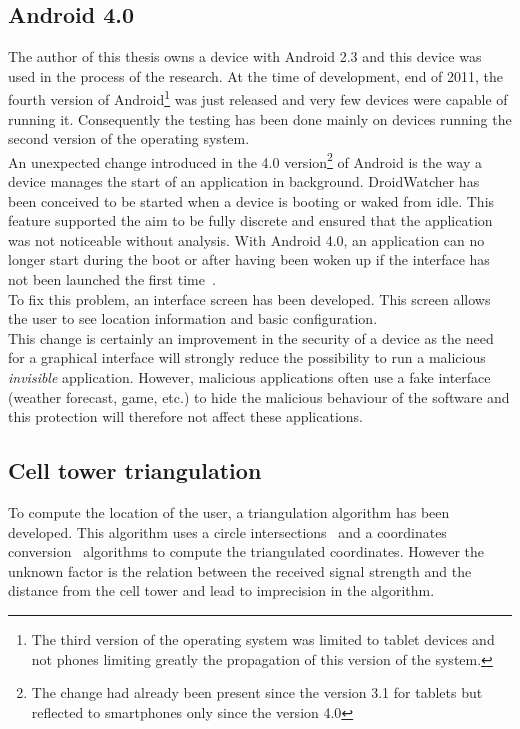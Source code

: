 \subsection{Android 4.0}
\label{sec:dw-ics}

The author of this thesis owns a device with Android 2.3 and this device was used in the process of the research. 
At the time of development, end of 2011, the fourth version of Android\footnote{The third version of the operating system was limited to tablet devices and not phones limiting greatly the propagation of this version of the system.} was just released and very few devices were capable of running it.
Consequently the testing has been done mainly on devices running the second version of the operating system.\\

An unexpected change introduced in the 4.0 version\footnote{The change had already been present since the version 3.1 for tablets but reflected to smartphones only since the version 4.0} of Android is the way a device manages the start of an application in background.
DroidWatcher has been conceived to be started when a device is booting or waked from idle.
This feature supported the aim to be fully discrete and ensured that the application was not noticeable without analysis.
With Android 4.0, an application can no longer start during the boot or after having been woken up if the interface has not been launched the first time~\cite{boot-restrictions}.\\

To fix this problem, an interface screen has been developed.
This screen allows the user to see location information and basic configuration.\\

This change is certainly an improvement in the security of a device as the need for a graphical interface will strongly reduce the possibility to run a malicious \emph{invisible} application.
However, malicious applications often use a fake interface (weather forecast, game, etc.) to hide the malicious behaviour of the software and this protection will therefore not affect these applications.

\subsection{Cell tower triangulation}
\label{sec:dw-difficult-cell}

To compute the location of the user, a triangulation algorithm has been developed.
This algorithm uses a circle intersections~\cite{circle-inter} and a coordinates conversion~\cite{ibm-coordinates} algorithms to compute the triangulated coordinates.
However the unknown factor is the relation between the received signal strength and the distance from the cell tower and lead to imprecision in the algorithm.\\

